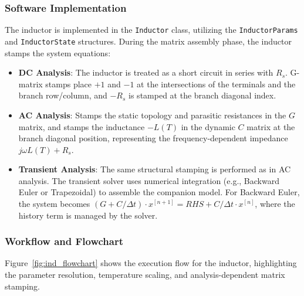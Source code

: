 \subsubsection{Software Implementation}
The inductor is implemented in the \texttt{Inductor} class, utilizing the \texttt{InductorParams} and \texttt{InductorState} structures.
During the matrix assembly phase, the inductor stamps the system equations:
\begin{itemize}
    \item \textbf{DC Analysis}: The inductor is treated as a short circuit in series with $R_s$. G-matrix stamps place $+1$ and $-1$ at the intersections of the terminals and the branch row/column, and $-R_s$ is stamped at the branch diagonal index.
    \item \textbf{AC Analysis}: Stamps the static topology and parasitic resistances in the $G$ matrix, and stamps the inductance $-L(T)$ in the dynamic $C$ matrix at the branch diagonal position, representing the frequency-dependent impedance $j \omega L(T) + R_s$.
    \item \textbf{Transient Analysis}: The same structural stamping is performed as in AC analysis. The transient solver uses numerical integration (e.g., Backward Euler or Trapezoidal) to assemble the companion model. For Backward Euler, the system becomes $(G + C/\Delta t) \cdot x^{[n+1]} = RHS + C/\Delta t \cdot x^{[n]}$, where the history term is managed by the solver.
\end{itemize}

\subsubsection{Workflow and Flowchart}
Figure~\ref{fig:ind_flowchart} shows the execution flow for the inductor, highlighting the parameter resolution, temperature scaling, and analysis-dependent matrix stamping.

